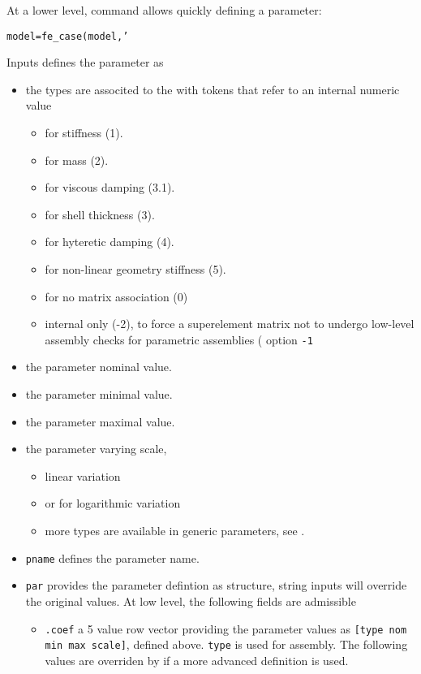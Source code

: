 \begin{SDT}
At a lower level, command  allows quickly defining a parameter:

{\tt model=fe\_case(model,'}

Inputs defines the parameter as
\begin{itemize}
\item {} the types are associted to the  with tokens that refer to an internal numeric value
\begin{itemize}
\item {} for stiffness (1).
\item {} for mass (2).
\item {} for viscous damping (3.1).
\item {} for shell thickness (3).
\item {} for hyteretic damping (4).
\item {} for non-linear geometry stiffness (5).
\item {} for no matrix association (0)
\item {} internal only (-2), to force a superelement matrix not to undergo low-level assembly checks for parametric assemblies ( option {\tt -1}
\end{itemize}
\item {} the parameter nominal value.
\item {} the parameter minimal value.
\item {} the parameter maximal value.
\item {} the parameter varying scale,
\begin{itemize}
\item {} linear variation
\item {} or  for logarithmic variation
\item more types are available in generic parameters, see \ferange.
\end{itemize}
\item {\tt pname} defines the parameter name.
\item {\tt par} provides the parameter defintion as structure, string inputs will override the original values. At low level, the following fields are admissible
\begin{itemize}
\item {\tt .coef} a 5 value row vector providing the parameter values as {\tt [type nom min max scale]}, defined above. {\tt type} is used for assembly. The following values are overriden by \ferange if a more advanced definition is used.

\end{itemize}
\end{itemize}
\end{SDT}
